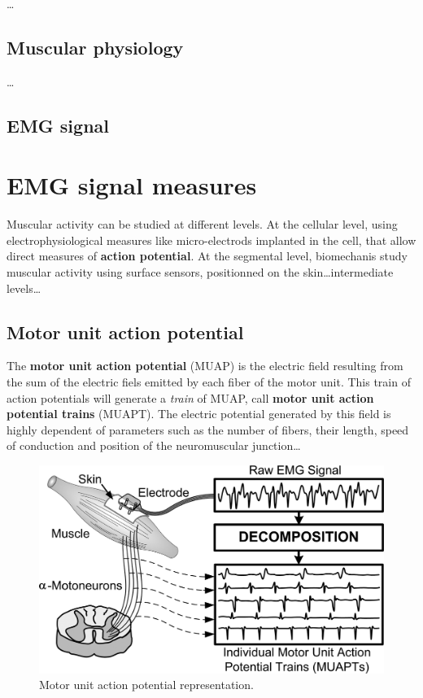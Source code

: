 \documentclass[a4paper,12pt,twoside,openright,oldfontcommands]{memoir}
\begin{document}
\ldots{}

\subsection{Muscular physiology}\label{muscular-physiology}

\ldots{}

\subsection{EMG signal}\label{emg-signal}

\section{EMG signal measures}\label{emg-signal-measures}

Muscular activity can be studied at different levels. At the cellular
level, using electrophysiological measures like micro-electrods
implanted in the cell, that allow direct measures of \textbf{action
potential}. At the segmental level, biomechanis study muscular activity
using surface sensors, positionned on the skin\ldots{}intermediate
levels\ldots{}

\subsection{Motor unit action
potential}\label{motor-unit-action-potential}

The \textbf{motor unit action potential} (MUAP) is the electric field
resulting from the sum of the electric fiels emitted by each fiber of
the motor unit. This train of action potentials will generate a
\emph{train} of MUAP, call \textbf{motor unit action potential trains}
(MUAPT). The electric potential generated by this field is highly
dependent of parameters such as the number of fibers, their length,
speed of conduction and position of the neuromuscular junction\ldots{}

\begin{figure}[H]

{\centering \includegraphics[width=1\linewidth]{assets/muap} 

}

\caption{Motor unit action potential representation.}\label{fig:muap}
\end{figure}
\end{document}
